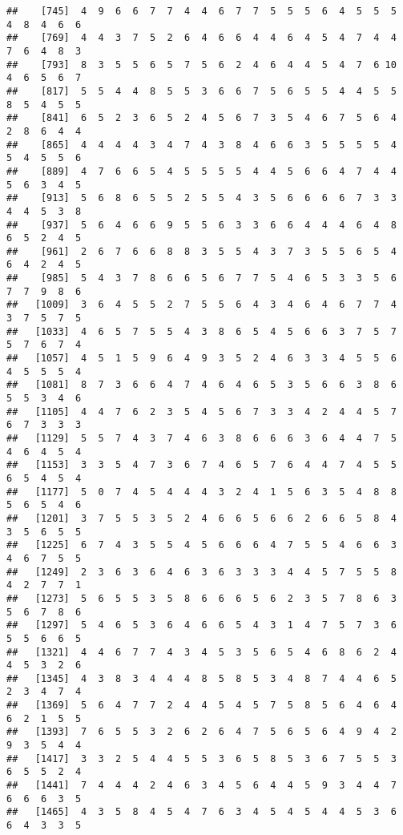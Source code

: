 \documentclass[
]{book}
\begin{document}
\begin{verbatim}
##    [745]  4  9  6  6  7  7  4  4  6  7  7  5  5  5  6  4  5  5  5  4  8  4  6  6
##    [769]  4  4  3  7  5  2  6  4  6  6  4  4  6  4  5  4  7  4  4  7  6  4  8  3
##    [793]  8  3  5  5  6  5  7  5  6  2  4  6  4  4  5  4  7  6 10  4  6  5  6  7
##    [817]  5  5  4  4  8  5  5  3  6  6  7  5  6  5  5  4  4  5  5  8  5  4  5  5
##    [841]  6  5  2  3  6  5  2  4  5  6  7  3  5  4  6  7  5  6  4  2  8  6  4  4
##    [865]  4  4  4  4  3  4  7  4  3  8  4  6  6  3  5  5  5  5  4  5  4  5  5  6
##    [889]  4  7  6  6  5  4  5  5  5  5  4  4  5  6  6  4  7  4  4  5  6  3  4  5
##    [913]  5  6  8  6  5  5  2  5  5  4  3  5  6  6  6  6  7  3  3  4  4  5  3  8
##    [937]  5  6  4  6  6  9  5  5  6  3  3  6  6  4  4  4  6  4  8  6  5  2  4  5
##    [961]  2  6  7  6  6  8  8  3  5  5  4  3  7  3  5  5  6  5  4  6  4  2  4  5
##    [985]  5  4  3  7  8  6  6  5  6  7  7  5  4  6  5  3  3  5  6  7  7  9  8  6
##   [1009]  3  6  4  5  5  2  7  5  5  6  4  3  4  6  4  6  7  7  4  3  7  5  7  5
##   [1033]  4  6  5  7  5  5  4  3  8  6  5  4  5  6  6  3  7  5  7  5  7  6  7  4
##   [1057]  4  5  1  5  9  6  4  9  3  5  2  4  6  3  3  4  5  5  6  4  5  5  5  4
##   [1081]  8  7  3  6  6  4  7  4  6  4  6  5  3  5  6  6  3  8  6  5  5  3  4  6
##   [1105]  4  4  7  6  2  3  5  4  5  6  7  3  3  4  2  4  4  5  7  6  7  3  3  3
##   [1129]  5  5  7  4  3  7  4  6  3  8  6  6  6  3  6  4  4  7  5  4  6  4  5  4
##   [1153]  3  3  5  4  7  3  6  7  4  6  5  7  6  4  4  7  4  5  5  6  5  4  5  4
##   [1177]  5  0  7  4  5  4  4  4  3  2  4  1  5  6  3  5  4  8  8  5  6  5  4  6
##   [1201]  3  7  5  5  3  5  2  4  6  6  5  6  6  2  6  6  5  8  4  3  5  6  5  5
##   [1225]  6  7  4  3  5  5  4  5  6  6  6  4  7  5  5  4  6  6  3  4  6  7  5  5
##   [1249]  2  3  6  3  6  4  6  3  6  3  3  3  4  4  5  7  5  5  8  4  2  7  7  1
##   [1273]  5  6  5  5  3  5  8  6  6  6  5  6  2  3  5  7  8  6  3  5  6  7  8  6
##   [1297]  5  4  6  5  3  6  4  6  6  5  4  3  1  4  7  5  7  3  6  5  5  6  6  5
##   [1321]  4  4  6  7  7  4  3  4  5  3  5  6  5  4  6  8  6  2  4  4  5  3  2  6
##   [1345]  4  3  8  3  4  4  4  8  5  8  5  3  4  8  7  4  4  6  5  2  3  4  7  4
##   [1369]  5  6  4  7  7  2  4  4  5  4  5  7  5  8  5  6  4  6  4  6  2  1  5  5
##   [1393]  7  6  5  5  3  2  6  2  6  4  7  5  6  5  6  4  9  4  2  9  3  5  4  4
##   [1417]  3  3  2  5  4  4  5  5  3  6  5  8  5  3  6  7  5  5  3  6  5  5  2  4
##   [1441]  7  4  4  4  2  4  6  3  4  5  6  4  4  5  9  3  4  4  7  6  6  6  3  5
##   [1465]  4  3  5  8  4  5  4  7  6  3  4  5  4  5  4  4  5  3  6  6  4  3  3  5

\end{verbatim}
\end{document}
